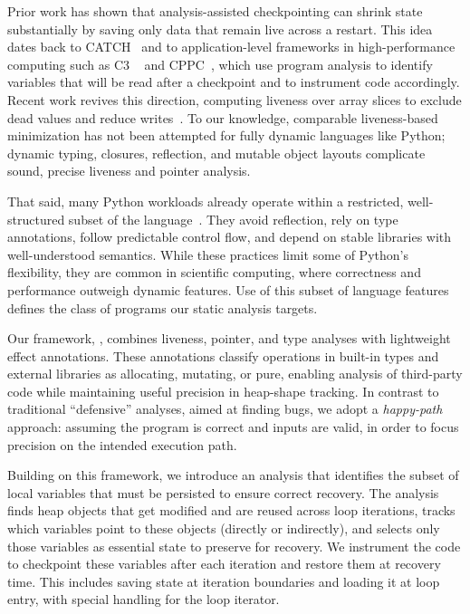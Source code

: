 Prior work has shown that analysis-assisted checkpointing can shrink state substantially by saving only data that remain live across a restart. This idea dates back to CATCH~\cite{li1990catch} and to application-level frameworks in high-performance computing such as C3 ~\cite{bronevetsky2004application} and CPPC~\cite{rodriguez2010cppc}, which use program analysis to identify variables that will be read after a checkpoint and to instrument code accordingly. Recent work revives this direction, computing liveness over array slices to exclude dead values and reduce writes~\cite{kim2024lact}. To our knowledge, comparable liveness-based minimization has not been attempted for fully dynamic languages like Python; dynamic typing, closures, reflection, and mutable object layouts complicate sound, precise liveness and pointer analysis.

That said, many Python workloads already operate within a restricted, well-structured subset of the language~\cite{bence2021unambiguity}. They avoid reflection, rely on type annotations, follow predictable control flow, and depend on stable libraries with well-understood semantics. While these practices limit some of Python's flexibility, they are common in scientific computing, where correctness and performance outweigh dynamic features. Use of this subset of language features defines the class of programs our static analysis targets.

Our framework, \spyte, combines liveness, pointer, and type analyses with lightweight effect annotations. These annotations classify operations in built-in types and external libraries as allocating, mutating, or pure, enabling analysis of third-party code while maintaining useful precision in heap-shape tracking. In contrast to traditional ``defensive'' analyses, aimed at finding bugs, we adopt a \emph{happy-path} approach: assuming the program is correct and inputs are valid, in order to focus precision on the intended execution path.

Building on this framework, we introduce an analysis that identifies the subset of local variables that must be persisted to ensure correct recovery. The analysis finds heap objects that get modified and are reused across loop iterations, tracks which variables point to these objects (directly or indirectly), and selects only those variables as essential state to preserve for recovery. We instrument the code to checkpoint these variables after each iteration and restore them at recovery time. This includes saving state at iteration boundaries and loading it at loop entry, with special handling for the loop iterator.

